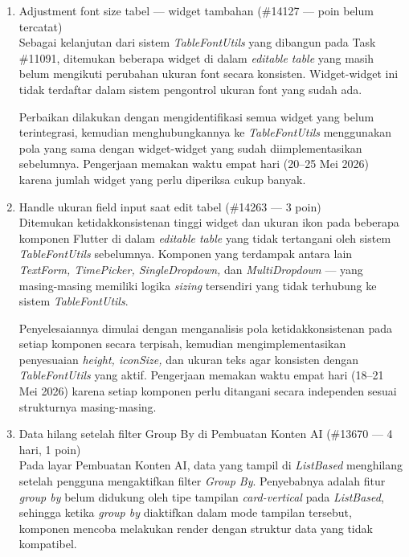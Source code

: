 \begin{enumerate}
          Perbaikan dilakukan dengan memperbaiki nama variabel yang salah ketik tersebut.
          Setelah perbaikan, fungsi sort kini berfungsi dengan benar untuk semua tipe
          data yang didukung.

    \item Adjustment font size tabel --- widget tambahan (\#14127 --- poin belum
          tercatat) \\ Sebagai kelanjutan dari sistem \textit{TableFontUtils} yang
          dibangun pada Task \#11091, ditemukan beberapa widget di dalam \textit{editable
              table} yang masih belum mengikuti perubahan ukuran font secara konsisten.
          Widget-widget ini tidak terdaftar dalam sistem pengontrol ukuran font yang
          sudah ada.

          Perbaikan dilakukan dengan mengidentifikasi semua widget yang belum
          terintegrasi, kemudian menghubungkannya ke \textit{TableFontUtils} menggunakan
          pola yang sama dengan widget-widget yang sudah diimplementasikan sebelumnya.
          Pengerjaan memakan waktu empat hari (20--25 Mei 2026) karena jumlah widget yang
          perlu diperiksa cukup banyak.

    \item Handle ukuran field input saat edit tabel (\#14263 --- 3 poin) \\ Ditemukan
          ketidakkonsistenan tinggi widget dan ukuran ikon pada beberapa komponen Flutter
          di dalam \textit{editable table} yang tidak tertangani oleh sistem
          \textit{TableFontUtils} sebelumnya. Komponen yang terdampak antara lain
          \textit{TextForm, TimePicker, SingleDropdown,} dan \textit{MultiDropdown} ---
          yang masing-masing memiliki logika \textit{sizing} tersendiri yang tidak
          terhubung ke sistem \textit{TableFontUtils}.

          Penyelesaiannya dimulai dengan menganalisis pola ketidakkonsistenan pada setiap
          komponen secara terpisah, kemudian mengimplementasikan penyesuaian
          \textit{height, iconSize,} dan ukuran teks agar konsisten dengan
          \textit{TableFontUtils} yang aktif. Pengerjaan memakan waktu empat hari (18--21
          Mei 2026) karena setiap komponen perlu ditangani secara independen sesuai
          strukturnya masing-masing.

    \item Data hilang setelah filter Group By di Pembuatan Konten AI (\#13670 --- 4 hari,
          1 poin) \\ Pada layar Pembuatan Konten AI, data yang tampil di
          \textit{ListBased} menghilang setelah pengguna mengaktifkan filter
          \textit{Group By}. Penyebabnya adalah fitur \textit{group by} belum didukung
          oleh tipe tampilan \textit{card-vertical} pada \textit{ListBased}, sehingga
          ketika \textit{group by} diaktifkan dalam mode tampilan tersebut, komponen
          mencoba melakukan render dengan struktur data yang tidak kompatibel.


\end{enumerate}

